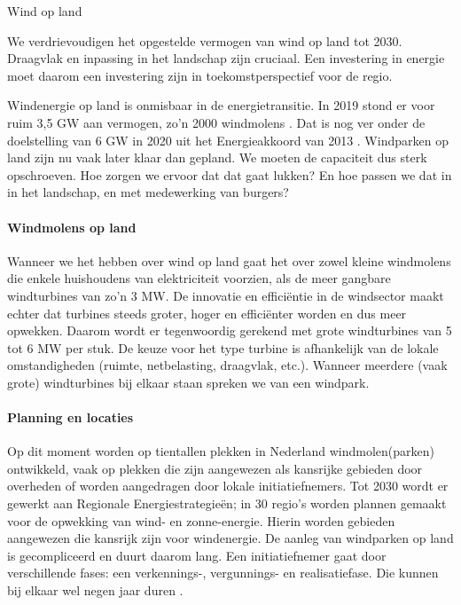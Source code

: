 \begin{voorstel}{Wind op land}


\begin{samenvatting}
We verdrievoudigen het opgestelde vermogen van wind op land tot 2030. Draagvlak en inpassing in het landschap zijn cruciaal. Een investering in energie moet daarom een investering zijn in toekomstperspectief voor de regio.
\end{samenvatting}

\begin{multicols}{2}

\begin{uitdaging}
Windenergie op land is onmisbaar in de energietransitie. In 2019 stond er voor ruim 3,5 GW aan vermogen, zo’n 2000 windmolens \parencite{cbs_statline_nodate}. Dat is nog ver onder de doelstelling van 6 GW in 2020 uit het Energieakkoord van 2013 \parencite{rijksoverheid_windenergie_2016}. Windparken op land zijn nu vaak later klaar dan gepland. We moeten de capaciteit dus sterk opschroeven. Hoe zorgen we ervoor dat dat gaat lukken? En hoe passen we dat in in het landschap, en met medewerking van burgers?
\end{uitdaging}

\begin{overwegingen}
\paragraph{Windmolens op land}
Wanneer we het hebben over wind op land gaat het over zowel kleine windmolens die enkele huishoudens van elektriciteit voorzien, als de meer gangbare windturbines van zo'n 3 MW. De innovatie en efficiëntie in de windsector maakt echter dat turbines steeds groter, hoger en efficiënter worden en dus meer opwekken. Daarom wordt er tegenwoordig gerekend met grote windturbines van 5 tot 6 MW per stuk. De keuze voor het type turbine is afhankelijk van de lokale omstandigheden (ruimte, netbelasting, draagvlak, etc.). Wanneer meerdere (vaak grote) windturbines bij elkaar staan spreken we van een windpark.

\paragraph{Planning en locaties}
Op dit moment worden op tientallen plekken in Nederland windmolen(parken) ontwikkeld, vaak op plekken die zijn aangewezen als kansrijke gebieden door overheden of worden aangedragen door lokale initiatiefnemers. Tot 2030 wordt er gewerkt aan Regionale Energiestrategieën; in 30 regio’s worden plannen gemaakt voor de opwekking van wind- en zonne-energie. Hierin worden gebieden aangewezen die kansrijk zijn voor windenergie. De aanleg van windparken op land is gecompliceerd en duurt daarom lang. Een initiatiefnemer gaat door verschillende fases: een verkennings-, vergunnings- en realisatiefase. Die kunnen bij elkaar wel negen jaar duren \parencite{rijksdienst_voor_ondernemend_nederland_windenergie_nodate}.


\end{overwegingen}
\end{multicols}
\end{voorstel}
